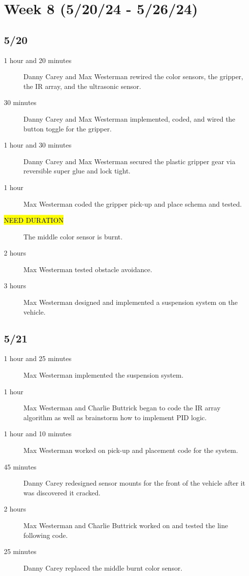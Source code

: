 \documentclass[11pt]{report}
\begin{document}
\section{Week 8 (5/20/24 - 5/26/24)}
\begin{adjustwidth}{0.5cm}{0cm}
\subsection*{5/20}
\begin{greylineformat}
\begin{description}
    \item [1 hour and 20 minutes] Danny Carey and Max Westerman rewired the color sensors, the gripper, the \gls{IR} array, and the ultrasonic sensor. 
    \item [30 minutes] Danny Carey and Max Westerman implemented, coded, and wired the button toggle for the gripper. 
    \item [1 hour and 30 minutes] Danny Carey and Max Westerman secured the plastic gripper gear via reversible super glue and lock tight. 
    \item [1 hour] Max Westerman coded the gripper pick-up and place schema and tested. 
    \item [\hl{NEED DURATION}] The middle color sensor is burnt.
    \item [2 hours] Max Westerman tested obstacle avoidance. 
    \item [3 hours] Max Westerman designed and implemented a suspension system on the vehicle. 
\end{description}\end{greylineformat}

\vspace{-2.1em}\subsection*{5/21}
\begin{greylineformat}
\begin{description}
    \item [1 hour and 25 minutes] Max Westerman implemented the suspension system. 
    \item [1 hour] Max Westerman and Charlie Buttrick began to code the \gls{IR} array algorithm as well as brainstorm how to implement \gls{PID} logic. 
    \item [1 hour and 10 minutes] Max Westerman worked on pick-up and placement code for the system. 
    \item [45 minutes] Danny Carey redesigned sensor mounts for the front of the vehicle after it was discovered it cracked. 
    \item [2 hours] Max Westerman and Charlie Buttrick worked on and tested the line following code. 
    \item [25 minutes] Danny Carey replaced the middle burnt color sensor. 
\end{description}\end{greylineformat}


\end{adjustwidth}
\end{document}
